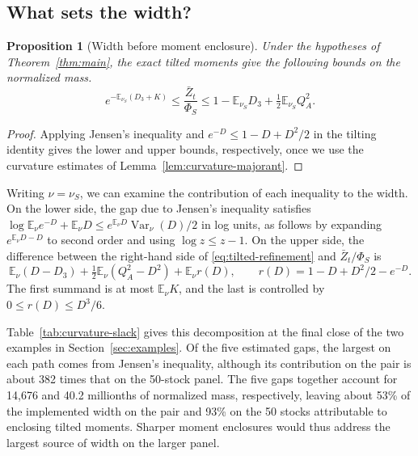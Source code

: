 \documentclass{article}
\numberwithin{equation}{section}
\newtheorem{proposition}[theorem]{Proposition}
\theoremstyle{remark}
\newcommand{\E}{\mathbb E}
\DeclareMathOperator{\Var}{Var}
\begin{document}
\subsection{What sets the width?}

\begin{proposition}[Width before moment enclosure]\label{prop:tilted-width}
Under the hypotheses of Theorem~\ref{thm:main}, the exact tilted moments
give the following bounds on the normalized mass.
\begin{equation}
 e^{-\E_{\nu_S}(D_3+K)}
 \le \frac{\bar Z_t}{\Phi_S}
 \le 1-\E_{\nu_S}D_3+\tfrac12\E_{\nu_S}Q_A^2 .
 \label{eq:tilted-refinement}
\end{equation}
\end{proposition}
\begin{proof}
Applying Jensen's inequality and $e^{-D}\le1-D+D^2/2$ in the tilting
identity gives the lower and upper bounds, respectively, once we use
the curvature estimates of Lemma~\ref{lem:curvature-majorant}.
\end{proof}

Writing $\nu=\nu_S$, we can examine the contribution of each inequality
to the width. On the lower side, the gap due to Jensen's inequality
satisfies $\log\E_\nu e^{-D}+\E_\nu D\le e^{\E_\nu D}\Var_\nu(D)/2$ in
log units, as follows by expanding $e^{\E_\nu D-D}$ to second order and
using $\log z\le z-1$. On the upper side, the difference between the
right-hand side of \eqref{eq:tilted-refinement} and $\bar Z_t/\Phi_S$ is
\[
 \E_\nu(D-D_3)+\tfrac12\E_\nu(Q_A^2-D^2)+\E_\nu r(D),\qquad
 r(D)=1-D+D^2/2-e^{-D}.
\]
The first summand is at most $\E_\nu K$, and the last is controlled
by $0\le r(D)\le D^3/6$.

Table~\ref{tab:curvature-slack} gives this decomposition at the final close
of the two examples in Section~\ref{sec:examples}. Of the five estimated
gaps, the largest on each path comes from Jensen's inequality, although
its contribution on the pair is about 382 times that on the 50-stock
panel. The five gaps together account for 14,676 and 40.2 millionths of
normalized mass, respectively, leaving about 53\% of the implemented width
on the pair and 93\% on the 50 stocks attributable to enclosing tilted
moments. Sharper moment enclosures would thus address the largest source
of width on the larger panel.
\end{document}
